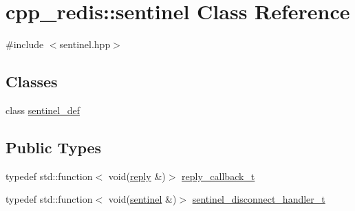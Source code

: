 \hypertarget{classcpp__redis_1_1sentinel}{}\section{cpp\+\_\+redis\+:\+:sentinel Class Reference}
\label{classcpp__redis_1_1sentinel}


{\ttfamily \#include $<$sentinel.\+hpp$>$}

\subsection*{Classes}
\begin{DoxyCompactItemize}
\item 
class \mbox{\hyperlink{classcpp__redis_1_1sentinel_1_1sentinel__def}{sentinel\+\_\+def}}
\end{DoxyCompactItemize}
\subsection*{Public Types}
\begin{DoxyCompactItemize}
\item 
typedef std\+::function$<$ void(\mbox{\hyperlink{classcpp__redis_1_1reply}{reply}} \&)$>$ \mbox{\hyperlink{classcpp__redis_1_1sentinel_ae1a150ff8787208c47414397a061c9a7}{reply\+\_\+callback\+\_\+t}}
\item 
typedef std\+::function$<$ void(\mbox{\hyperlink{classcpp__redis_1_1sentinel}{sentinel}} \&)$>$ \mbox{\hyperlink{classcpp__redis_1_1sentinel_a923e06b5b700c16dffec8a01d2fa9aa4}{sentinel\+\_\+disconnect\+\_\+handler\+\_\+t}}
\end{DoxyCompactItemize}
